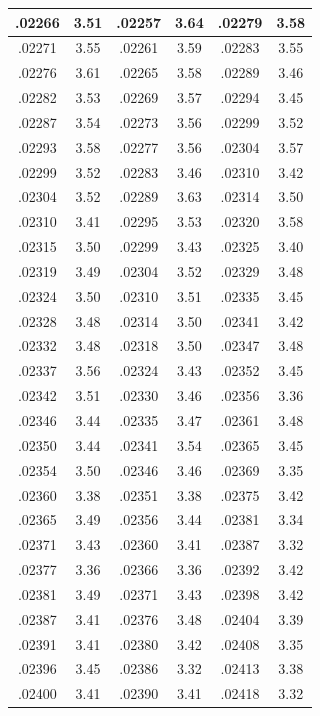 \documentclass[11pt]{report}
\begin{document}
\begin{appendices}
\begin{longtable}{|c|c||c|c||c|c|}
.02266 & 3.51 & .02257 & 3.64 & .02279 & 3.58\\\hline
.02271 & 3.55 & .02261 & 3.59 & .02283 & 3.55\\\hline
.02276 & 3.61 & .02265 & 3.58 & .02289 & 3.46\\\hline
.02282 & 3.53 & .02269 & 3.57 & .02294 & 3.45\\\hline
.02287 & 3.54 & .02273 & 3.56 & .02299 & 3.52\\\hline
.02293 & 3.58 & .02277 & 3.56 & .02304 & 3.57\\\hline
.02299 & 3.52 & .02283 & 3.46 & .02310 & 3.42\\\hline
.02304 & 3.52 & .02289 & 3.63 & .02314 & 3.50\\\hline
.02310 & 3.41 & .02295 & 3.53 & .02320 & 3.58\\\hline
.02315 & 3.50 & .02299 & 3.43 & .02325 & 3.40\\\hline
.02319 & 3.49 & .02304 & 3.52 & .02329 & 3.48\\\hline
.02324 & 3.50 & .02310 & 3.51 & .02335 & 3.45\\\hline
.02328 & 3.48 & .02314 & 3.50 & .02341 & 3.42\\\hline
.02332 & 3.48 & .02318 & 3.50 & .02347 & 3.48\\\hline
.02337 & 3.56 & .02324 & 3.43 & .02352 & 3.45\\\hline
.02342 & 3.51 & .02330 & 3.46 & .02356 & 3.36\\\hline
.02346 & 3.44 & .02335 & 3.47 & .02361 & 3.48\\\hline
.02350 & 3.44 & .02341 & 3.54 & .02365 & 3.45\\\hline
.02354 & 3.50 & .02346 & 3.46 & .02369 & 3.35\\\hline
.02360 & 3.38 & .02351 & 3.38 & .02375 & 3.42\\\hline
.02365 & 3.49 & .02356 & 3.44 & .02381 & 3.34\\\hline
.02371 & 3.43 & .02360 & 3.41 & .02387 & 3.32\\\hline
.02377 & 3.36 & .02366 & 3.36 & .02392 & 3.42\\\hline
.02381 & 3.49 & .02371 & 3.43 & .02398 & 3.42\\\hline
.02387 & 3.41 & .02376 & 3.48 & .02404 & 3.39\\\hline
.02391 & 3.41 & .02380 & 3.42 & .02408 & 3.35\\\hline
.02396 & 3.45 & .02386 & 3.32 & .02413 & 3.38\\\hline
.02400 & 3.41 & .02390 & 3.41 & .02418 & 3.32\\\hline

\end{longtable}
\end{appendices}
\end{document}
